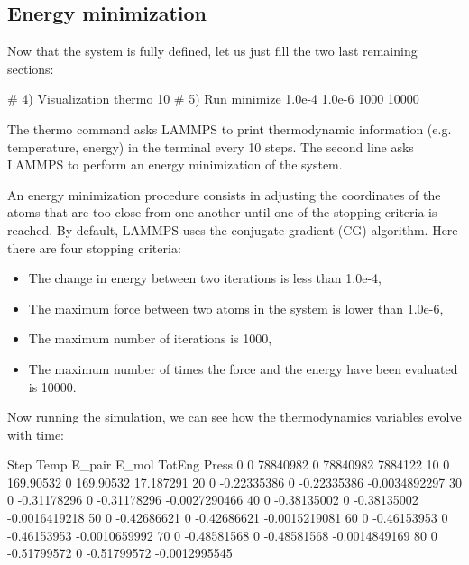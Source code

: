 \noindent \subsection{Energy minimization}

Now that the system is fully defined, let us just fill the two last remaining sections:

\begin{lcverbatim}
# 4) Visualization
thermo 10
# 5) Run
minimize 1.0e-4 1.0e-6 1000 10000
\end{lcverbatim}

\noindent The thermo command asks LAMMPS to print
thermodynamic information (e.g. temperature, energy) in the
terminal every 10 steps. The second line asks LAMMPS to
perform an energy minimization of the system.

\begin{tcolorbox}[colback=mylightblue!5!white,colframe=mylightblue!75!black,title=About energy minimization]
An energy minimization procedure consists in adjusting
the coordinates of the atoms that are too close from one another until one of the stopping
criteria is reached. By default, LAMMPS uses the conjugate gradient (CG) algorithm.
Here there are four stopping criteria:
\begin{itemize}
\item The change in energy between two iterations is less than 1.0e-4,
\item The maximum force between two atoms in the system is lower than 1.0e-6,
\item The maximum number of iterations is 1000,
\item The maximum number of times the force and the energy have been evaluated is 10000.
\end{itemize}
\end{tcolorbox}

\noindent Now running the simulation, we can see how the thermodynamics
variables evolve with time:

\begin{lcverbatim}
Step Temp         E_pair  E_mol       TotEng         Press
0       0       78840982      0     78840982       7884122 
10      0      169.90532      0    169.90532     17.187291 
20      0    -0.22335386      0  -0.22335386 -0.0034892297 
30      0    -0.31178296      0  -0.31178296 -0.0027290466 
40      0    -0.38135002      0  -0.38135002 -0.0016419218 
50      0    -0.42686621      0  -0.42686621 -0.0015219081 
60      0    -0.46153953      0  -0.46153953 -0.0010659992 
70      0    -0.48581568      0  -0.48581568 -0.0014849169 
80      0    -0.51799572      0  -0.51799572 -0.0012995545 
\end{lcverbatim}


